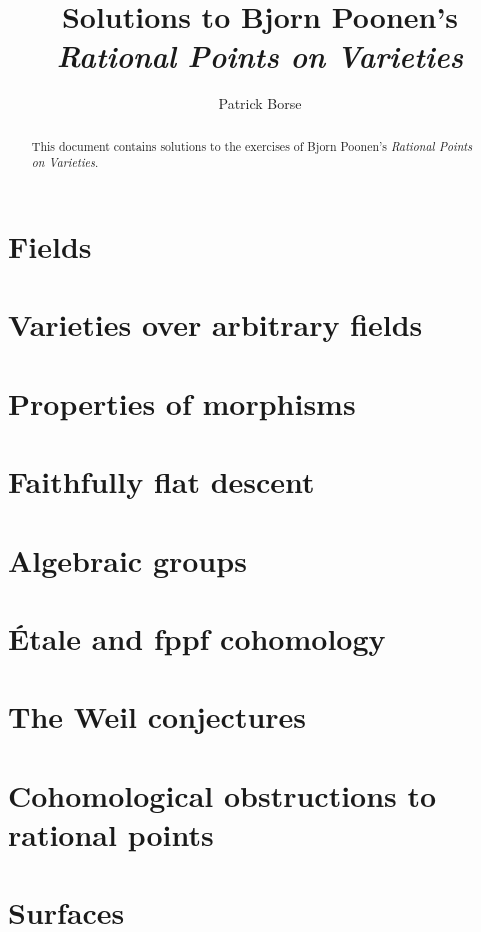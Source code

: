 \documentclass[oneside]{amsbook}
\title{Solutions to Bjorn Poonen's \emph{Rational Points on Varieties}}
\author{Patrick Borse}
\begin{document}
\begin{abstract}
This document contains solutions to the exercises of Bjorn Poonen's \emph{Rational Points on Varieties}.
\end{abstract}

\maketitle

\tableofcontents

\chapter{Fields}


\chapter{Varieties over arbitrary fields}


\chapter{Properties of morphisms}


\chapter{Faithfully flat descent}


\chapter{Algebraic groups}


\chapter{Étale and fppf cohomology}


\chapter{The Weil conjectures}


\chapter{Cohomological obstructions to rational points}


\chapter{Surfaces}

\end{document}
